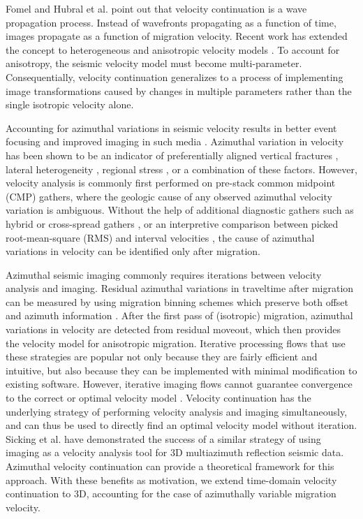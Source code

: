 Fomel \cite{fomel94} and Hubral et al. \cite{hubral_etal96} point out that velocity continuation is a wave propagation process.  
Instead of wavefronts propagating as a function of time, images propagate as a function of migration velocity.  
Recent work has extended the concept to heterogeneous and anisotropic velocity models \cite[]{Alkhalifah.sep.94.tariq3, GEO67-01-01260134, iversen06, schleicher_alexio07, schleicher_etal08b, duchkov_dehoop09}.  
To account for anisotropy, the seismic velocity model must become multi-parameter.  
Consequentially, velocity continuation generalizes to a process of implementing image transformations caused by changes in multiple parameters rather than the single isotropic velocity alone.

Accounting for azimuthal variations in seismic velocity results in better event focusing and improved imaging in such media \cite[]{sicking_nelan08}.  
Azimuthal variation in velocity has been shown to be an indicator of preferentially aligned vertical fractures \cite[]{crampin84}, lateral heterogeneity \cite[]{GEO50-11-20262032}, regional stress \cite[]{sicking_nelan_mclain07}, or a combination of these factors.  
However, velocity analysis is commonly first performed on pre-stack common midpoint (CMP) gathers, where the geologic cause of any observed azimuthal velocity variation is ambiguous.  
Without the help of additional diagnostic gathers such as hybrid or cross-spread gathers \cite[]{GEO36-06-10991137}, or an interpretive comparison between picked root-mean-square (RMS) and interval velocities \cite[]{jenner08}, the cause of azimuthal variations in velocity can be identified only after migration.  

Azimuthal seismic imaging commonly requires iterations between velocity analysis and imaging.  
Residual azimuthal variations in traveltime after migration can be measured by using migration binning schemes which preserve both offset and azimuth information \cite[]{cary99,vermeer99}.
After the first pass of (isotropic) migration, azimuthal variations in velocity are detected from residual moveout, which then provides the velocity model for anisotropic migration.  
Iterative processing flows that use these strategies are popular not only because they are fairly efficient and intuitive, but also because they can be implemented with minimal modification to existing software.  However, iterative imaging flows cannot guarantee convergence to the correct or optimal velocity model \cite[]{FBR08-06-02240234}.  
Velocity continuation has the underlying strategy of performing velocity analysis and imaging simultaneously, and can thus be used to directly find an optimal velocity model without iteration.  
Sicking et al. \cite{sicking_nelan_mclain07} have demonstrated the success of a similar strategy of using imaging as a velocity analysis tool for 3D multiazimuth reflection seismic data.  
Azimuthal velocity continuation can provide a theoretical framework for this approach.  
With these benefits as motivation, we extend time-domain velocity continuation to 3D, accounting for the case of azimuthally variable migration velocity.


